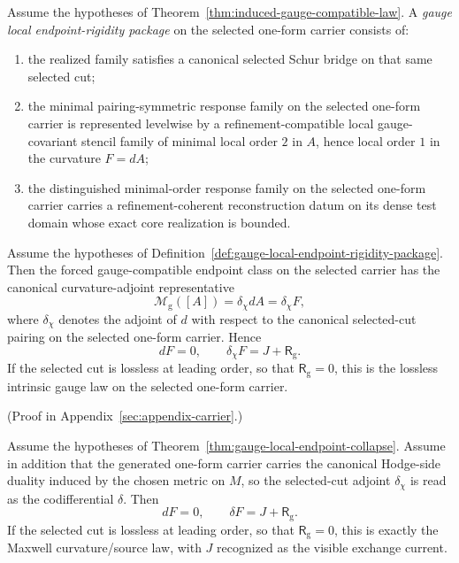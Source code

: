 \begin{definition}
\label{def:gauge-local-endpoint-rigidity-package}
Assume the hypotheses of Theorem~\ref{thm:induced-gauge-compatible-law}. A
\emph{gauge local endpoint-rigidity package} on the selected one-form carrier
consists of:
\begin{enumerate}[label=(\roman*),itemsep=0.2em]
\item the realized family satisfies a canonical selected Schur bridge on that
      same selected cut;
\item the minimal pairing-symmetric response family on the selected one-form
      carrier is represented levelwise by a refinement-compatible local
      gauge-covariant stencil family of minimal local order \(2\) in \(A\),
      hence local order \(1\) in the curvature \(F=dA\);
\item the distinguished minimal-order response family on the selected one-form
      carrier carries a refinement-coherent reconstruction datum on its dense
      test domain whose exact core realization is bounded.
\end{enumerate}
\end{definition}

\begin{theorem}
\label{thm:gauge-local-endpoint-collapse}
Assume the hypotheses of
Definition~\ref{def:gauge-local-endpoint-rigidity-package}. Then the forced
gauge-compatible endpoint class on the selected carrier has the canonical
curvature-adjoint representative
\[
\mathcal M_{\mathrm g}([A])=\delta_{\chi} dA=\delta_{\chi}F,
\]
where \(\delta_{\chi}\) denotes the adjoint of \(d\) with respect to the
canonical selected-cut pairing on the selected one-form carrier. Hence
\[
dF=0,
\qquad
\delta_{\chi}F=J+\mathsf R_{\mathrm g}.
\]
If the selected cut is lossless at leading order, so that
\(\mathsf R_{\mathrm g}=0\), this is the lossless intrinsic gauge law on the
selected one-form carrier.
\end{theorem}

(Proof in Appendix~\ref{sec:appendix-carrier}.)

\begin{corollary}
\label{cor:recognizable-maxwell-identity}
Assume the hypotheses of
Theorem~\ref{thm:gauge-local-endpoint-collapse}. Assume in addition that the
generated one-form carrier carries the canonical Hodge-side duality induced by
the chosen metric on \(M\), so the selected-cut adjoint \(\delta_{\chi}\) is
read as the codifferential \(\delta\).
Then
\[
dF=0,
\qquad
\delta F=J+\mathsf R_{\mathrm g}.
\]
If the selected cut is lossless at leading order, so that
\(\mathsf R_{\mathrm g}=0\), this is exactly the Maxwell curvature/source law,
with \(J\) recognized as the visible exchange current.
\end{corollary}

